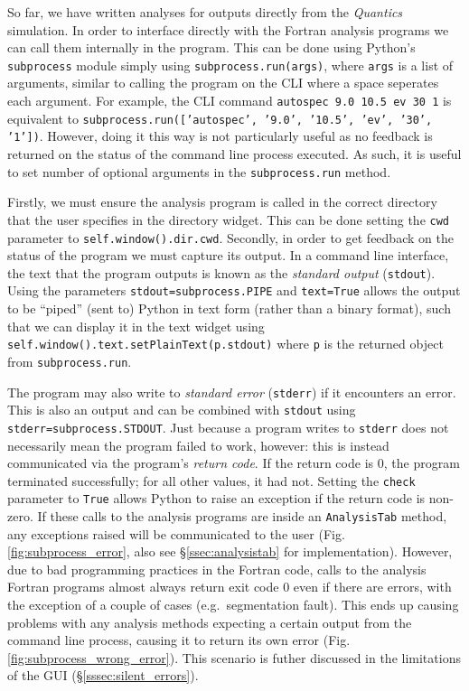 \documentclass[12pt]{article}
\begin{document}
So far, we have written analyses for outputs directly from the \textit{Quantics} simulation. In order to interface directly with the Fortran analysis programs we can call them internally in the program. This can be done using Python's \texttt{subprocess} module simply using \texttt{subprocess.run(args)}, where \texttt{args} is a list of arguments, similar to calling the program on the CLI where a space seperates each argument. For example, the CLI command \texttt{autospec 9.0 10.5 ev 30 1} is equivalent to \texttt{subprocess.run(['autospec', '9.0', '10.5', 'ev', '30', '1'])}. However, doing it this way is not particularly useful as no feedback is returned on the status of the command line process executed. As such, it is useful to set number of optional arguments in the \texttt{subprocess.run} method.

Firstly, we must ensure the analysis program is called in the correct directory that the user specifies in the directory widget. This can be done setting the \texttt{cwd} parameter to \texttt{self.window().dir.cwd}. Secondly, in order to get feedback on the status of the program we must capture its output. In a command line interface, the text that the program outputs is known as the \textit{standard output} (\texttt{stdout}). Using the parameters  \texttt{stdout=subprocess.PIPE} and \texttt{text=True} allows the output to be ``piped'' (sent to) Python in text form (rather than a binary format), such that we can display it in the text widget using \texttt{self.window().text.setPlainText(p.stdout)} where \texttt{p} is the returned object from \texttt{subprocess.run}.

The program may also write to \textit{standard error} (\texttt{stderr}) if it encounters an error. This is also an output and can be combined with \texttt{stdout} using \texttt{stderr=subprocess.STDOUT}. Just because a program writes to \texttt{stderr} does not necessarily mean the program failed to work, however: this is instead communicated via the program's \textit{return code}. If the return code is 0, the program terminated successfully; for all other values, it had not. Setting the \texttt{check} parameter to \texttt{True} allows Python to raise an exception if the return code is non-zero. If these calls to the analysis programs are inside an \texttt{AnalysisTab} method, any exceptions raised will be communicated to the user (Fig. \ref{fig:subprocess_error}, also see \S\ref{ssec:analysistab} for implementation). However, due to bad programming practices in the Fortran code, calls to the analysis Fortran programs almost always return exit code 0 even if there are errors, with the exception of a couple of cases (e.g.~segmentation fault). This ends up causing problems with any analysis methods expecting a certain output from the command line process, causing it to return its own error (Fig. \ref{fig:subprocess_wrong_error}). This scenario is futher discussed in the limitations of the GUI (\S\ref{sssec:silent_errors}).
\end{document}
